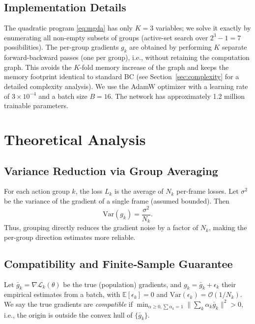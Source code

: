 \documentclass[conference]{IEEEtran}
\newcommand{\E}{\mathbb{E}}
\newcommand{\Var}{\mathrm{Var}}
\begin{document}
\subsection{Implementation Details}
The quadratic program \eqref{eq:mgda} has only $K=3$ variables; we solve it exactly by enumerating all non-empty subsets of groups (active-set search over $2^3-1 = 7$ possibilities). The per-group gradients $g_k$ are obtained by performing $K$ separate forward-backward passes (one per group), i.e., without retaining the computation graph. This avoids the $K$-fold memory increase of the graph and keeps the memory footprint identical to standard BC (see Section~\ref{sec:complexity} for a detailed complexity analysis). We use the AdamW optimizer with a learning rate of $3\times10^{-4}$ and a batch size $B=16$. The network has approximately 1.2 million trainable parameters.

\section{Theoretical Analysis}

\subsection{Variance Reduction via Group Averaging}
For each action group $k$, the loss $L_k$ is the average of $N_k$ per-frame losses.
Let $\sigma^2$ be the variance of the gradient of a single frame (assumed bounded).
Then
\[
\Var(g_k) = \frac{\sigma^2}{N_k}.
\]
Thus, grouping directly reduces the gradient noise by a factor of $N_k$, making the per-group direction estimates more reliable.

\subsection{Compatibility and Finite‑Sample Guarantee}
Let $\bar{g}_k = \nabla \mathcal{L}_k(\theta)$ be the true (population) gradients, and
$g_k = \bar{g}_k + \epsilon_k$ their empirical estimates from a batch, with $\E[\epsilon_k]=0$ and
$\Var(\epsilon_k) = \mathcal{O}(1/N_k)$.
We say the true gradients are \emph{compatible} if
$\min_{\alpha\ge 0,\sum\alpha_k=1} \|\sum_k \alpha_k \bar{g}_k\|^2 > 0$,
i.e., the origin is outside the convex hull of $\{\bar{g}_k\}$.
\end{document}
